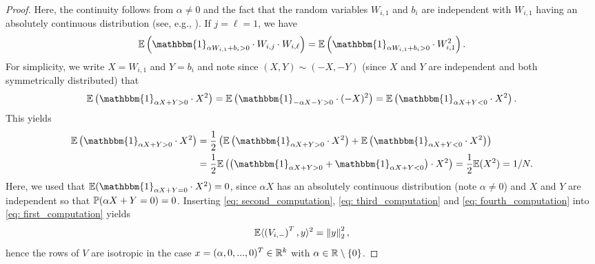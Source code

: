 \begin{proof}
Here, the continuity follows from $\alpha \neq 0$ and the fact that the random variables $W_{i,1}$ and $b_i$ are independent with $W_{i,1}$ having an absolutely continuous distribution (see, e.g., \cite[Proposition~9.1.6]{dudley2002real}).
If $j = \ell = 1$, we have
\begin{equation*} 
    \EE \left(\mathbbm{1}_{\alpha W_{i,1} + b_i> 0} \cdot W_{i,j} \cdot W_{i, \ell}\right) = \EE \left(\mathbbm{1}_{\alpha W_{i,1} + b_i > 0} \cdot W_{i,1}^2\right).
\end{equation*}
For simplicity, we write $X = W_{i,1}$ and $Y = b_i$ and note since $(X,Y) \sim (-X, -Y)$ (since $X$ and $Y$ are independent and both symmetrically distributed) that
\begin{equation*}
    \EE \left(\mathbbm{1}_{\alpha X+Y > 0} \cdot X^2\right) = \EE \left(\mathbbm{1}_{-\alpha X-Y > 0} \cdot (-X)^2\right) = \EE \left(\mathbbm{1}_{\alpha X+Y < 0} \cdot X^2\right).
\end{equation*}
This yields
\begin{align}
    \EE \left(\mathbbm{1}_{\alpha X+Y > 0} \cdot X^2\right) &= \frac{1}{2} \left(\EE \left(\mathbbm{1}_{\alpha X+Y > 0} \cdot X^2\right) + \EE \left(\mathbbm{1}_{\alpha X+Y < 0} \cdot X^2\right)\right) \nonumber\\
    \label{eq: fourth_computation}
    &= \frac{1}{2}\EE \left(\left(\mathbbm{1}_{\alpha X+Y > 0}+\mathbbm{1}_{\alpha X+Y < 0}\right) \cdot X^2\right) = \frac{1}{2}\EE (X^2) = 1/N.
\end{align}
Here, we used that $\EE (\mathbbm{1}_{\alpha X + Y = 0} \cdot X^2) = 0$, since $\alpha X$ has an absolutely continuous distribution (note $\alpha \neq 0$) and $X$ and $Y$ are independent so that $\mathbb{P} (\alpha X + Y = 0) =0$. 
Inserting \eqref{eq: second_computation}, \eqref{eq: third_computation} and \eqref{eq: fourth_computation} into \eqref{eq: first_computation} yields 
\begin{equation*}
    \mathbb{E} \langle \left(V_{i,-}\right)^T, y\rangle^2 = \left\Vert y \right\Vert_2^2,
\end{equation*}
hence the rows of $V$ are isotropic in the case $x = (\alpha,0,...,0)^T \in \mathbb{R}^k$ with $\alpha \in \mathbb{R} \setminus \{0\}$.


\end{proof}
